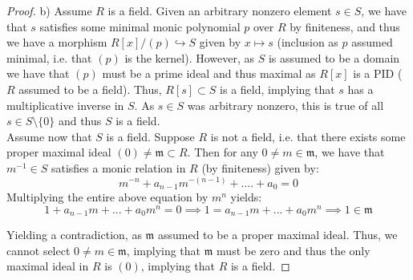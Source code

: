 \documentclass{article}
\newcommand{\fk}[1]{\mathfrak{#1}}
\begin{document}
\begin{proof}
b) Assume $R$ is a field. Given an arbitrary nonzero element $s \in S$, we have that $s$ satisfies some minimal monic polynomial $p$ over $R$ by finiteness, and thus we have a morphism $R[x]/(p) \hookrightarrow S$ given by $x \mapsto s$ (inclusion as $p$ assumed minimal, i.e. that $(p)$ is the kernel). However, as $S$ is assumed to be a domain we have that $(p)$ must be a prime ideal and thus maximal as $R[x]$ is a PID ($R$ assumed to be a field). Thus, $R[s] \subset S$ is a field, implying that $s$ has a multiplicative inverse in $S$. As $s \in S$ was arbitrary nonzero, this is true of all $s \in S \setminus \{0\}$ and thus $S$ is a field. \\
Assume now that $S$ is a field. Suppose $R$ is not a field, i.e. that there exists some proper maximal ideal $(0) \neq \fk{m} \subset R$. Then for any $0 \neq m \in \fk{m}$, we have that $m^{-1} \in S$ satisfies a monic relation in $R$ (by finiteness) given by:
\[
  m^{-n} + a_{n-1}m^{-(n-1)} + ....+ a_{0} = 0
\]
Multiplying the entire above equation by $m^{n}$ yields:
\[
  1 + a_{n-1}m + ... + a_{0}m^{n} = 0 \implies 1 = a_{n-1}m + ... + a_{0}m^{n} \implies 1 \in \fk{m}
\]

Yielding a contradiction, as $\fk{m}$ assumed to be a proper maximal ideal. Thus, we cannot select $0 \neq m \in \fk{m}$, implying that $\fk{m}$ must be zero and thus the only maximal ideal in $R$ is $(0)$, implying that $R$ is a field.
\end{proof}
\end{document}
